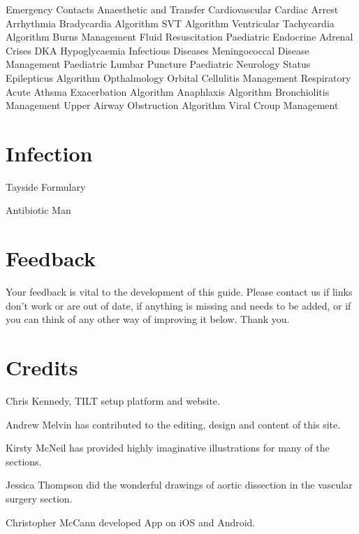 \documentclass[]{book}
\begin{document}
Emergency Contacts
Anaesthetic and Transfer
Cardiovascular
Cardiac Arrest
Arrhythmia
Bradycardia Algorithm
SVT Algorithm
Ventricular Tachycardia Algorithm
Burns Management
Fluid Resuscitation
Paediatric Endocrine
Adrenal Crises
DKA
Hypoglycaemia
Infectious Diseases
Meningococcal Disease Management
Paediatric Lumbar Puncture
Paediatric Neurology
Status Epilepticus Algorithm
Opthalmology
Orbital Cellulitis Management
Respiratory
Acute Athsma Exacerbation Algorithm
Anaphlaxis Algorithm
Bronchiolitis Management
Upper Airway Obstruction Algorithm
Viral Croup Management

\hypertarget{infection}{%
\chapter{Infection}\label{infection}}

Tayside Formulary

Antibiotic Man

\hypertarget{feedback}{%
\chapter{Feedback}\label{feedback}}

Your feedback is vital to the development of this guide. Please contact us if links don't work or are out of date, if anything is missing and needs to be added, or if you can think of any other way of improving it below. Thank you.

\hypertarget{credits}{%
\chapter{Credits}\label{credits}}

Chris Kennedy, TILT setup platform and website.

Andrew Melvin has contributed to the editing, design and content of this site.

Kirsty McNeil has provided highly imaginative illustrations for many of the sections.

Jessica Thompson did the wonderful drawings of aortic dissection in the vascular surgery section.

Christopher McCann developed App on iOS and Android.


\end{document}
